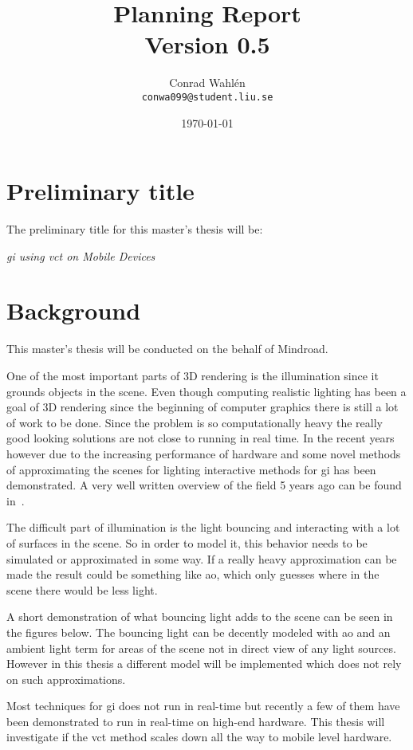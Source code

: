 \documentclass[a4paper, 12pt]{article}
\title{Planning Report \\ \small{Version 0.5}}
\author{Conrad Wahlén \\ \texttt{conwa099@student.liu.se}}
\date{\today}
\begin{document}
\maketitle
\thispagestyle{empty}
\newpage


\section{Preliminary title}
\label{sec:Preliminary title}

The preliminary title for this master's thesis will be:

\textit{\acrlong{gi} using \acrlong{vct} on Mobile Devices}

\section{Background}
\label{sec:Background}

This master's thesis will be conducted on the behalf of Mindroad.

One of the most important parts of 3D rendering is the illumination since it grounds objects in the scene. Even though computing realistic lighting has been a goal of 3D rendering since the beginning of computer graphics there is still a lot of work to be done. Since the problem is so computationally heavy the really good looking solutions are not close to running in real time.
In the recent years however due to the increasing performance of hardware and some novel methods of approximating the scenes for lighting interactive methods for \gls{gi} has been demonstrated. A very well written overview of the field 5 years ago can be found in~\cite{sotagi}.

The difficult part of illumination is the light bouncing and interacting with a lot of surfaces in the scene. So in order to model it, this behavior needs to be simulated or approximated in some way. If a really heavy approximation can be made the result could be something like \gls{ao}, which only guesses where in the scene there would be less light.

A short demonstration of what bouncing light adds to the scene can be seen in the figures below. The bouncing light can be decently modeled with \gls{ao} and an ambient light term for areas of the scene not in direct view of any light sources. However in this thesis a different model will be implemented which does not rely on such approximations.

Most techniques for \gls{gi} does not run in real-time but recently a few of them have been demonstrated to run in real-time on high-end hardware. This thesis will investigate if the \gls{vct} method scales down all the way to mobile level hardware.
\end{document}
